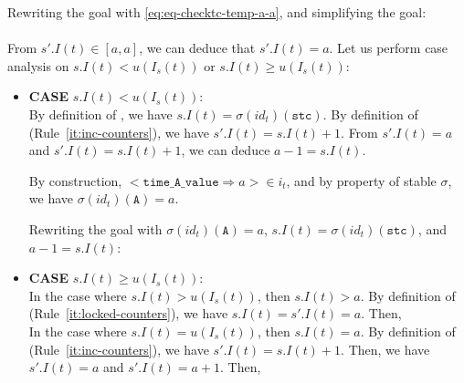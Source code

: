 \documentclass[dvipsnames,12pt]{article}
\begin{document}
\begin{niproof}
\begin{enumerate}
\begin{enumerate}
\begin{enumerate}
\begin{itemize}
\begin{itemize}
            Rewriting the goal with \eqref{eq:eq-checktc-temp-a-a},
            and simplifying the goal:\\
            \\
            
            From $s'.I(t)\in[a,a]$, we can deduce that
            $s'.I(t)=a$. Let us perform case analysis on
            $s.I(t)<u(I_s(t))$ or $s.I(t)\ge{}u(I_s(t))$:
            
            \begin{itemize}
            \item \textbf{CASE} $s.I(t)<u(I_s(t))$:\\
              By definition of \upSim, we have
              $s.I(t)=\sigma(id_t)(\texttt{stc})$. By definition of
              \dwSitpn{} (Rule~\ref{it:inc-counters}), we have
              $s'.I(t)=s.I(t)+1$. From $s'.I(t)=a$ and
              $s'.I(t)=s.I(t)+1$, we can deduce $a-1=s.I(t)$.

              By construction,
              ${<}\mathtt{time\_A\_value\Rightarrow}{}a{>}\in{}i_t$,
              and by property of stable $\sigma$, we have
              $\sigma(id_t)(\texttt{A})=a$.

              Rewriting the goal with $\sigma(id_t)(\texttt{A})=a$,
              $s.I(t)=\sigma(id_t)(\texttt{stc})$, and $a-1=s.I(t)$:
              
            \item \textbf{CASE} $s.I(t)\ge{}u(I_s(t))$:\\
              In the case where $s.I(t)>u(I_s(t))$, then
              $s.I(t)>a$.  By definition of \dwSitpn{}
              (Rule~\ref{it:locked-counters}), we have
              $s.I(t)=s'.I(t)=a$. Then, \\

              In the case where $s.I(t)=u(I_s(t))$, then
              $s.I(t)=a$. By definition of \dwSitpn{}
              (Rule~\ref{it:inc-counters}), we have
              $s'.I(t)=s.I(t)+1$. Then, we have $s'.I(t)=a$ and
              $s'.I(t)=a+1$. Then, 
            \end{itemize}
            

\end{itemize}
\end{itemize}
\end{enumerate}
\end{enumerate}
\end{enumerate}
\end{niproof}
\end{document}
